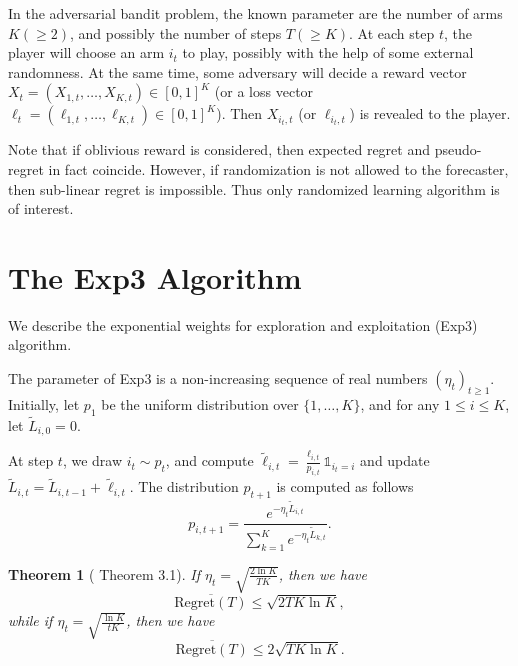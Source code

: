 \documentclass[openany]{book}
\newtheorem{theorem}{Theorem}[chapter]
\theoremstyle{definition}
\theoremstyle{remark}
\begin{document}
In the adversarial bandit problem, the known parameter are the number of arms $K(\ge2)$, and possibly the number of steps $T(\ge K)$. At each step $t$, the player will choose an arm $i_t$ to play, possibly with the help of some external randomness. At the same time, some adversary will decide a reward vector $X_t=(X_{1,t},\ldots,X_{K,t})\in[0,1]^K$ (or a loss vector $\ell_t=(\ell_{1,t},\ldots,\ell_{K,t})\in[0,1]^K$). Then $X_{i_t,t}$ (or $\ell_{i_t,t}$) is revealed to the player.

Note that if oblivious reward is considered, then expected regret and pseudo-regret in fact coincide. However, if randomization is not allowed to the forecaster, then sub-linear regret is impossible. Thus only randomized learning algorithm is of interest.

\section{The Exp3 Algorithm}
We describe the exponential weights for exploration and exploitation (Exp3) algorithm.

The parameter of Exp3 is a non-increasing sequence of real numbers $(\eta_t)_{t\ge1}$. Initially, let $p_1$ be the uniform distribution over $\{1,\ldots,K\}$, and for any $1\le i\le K$, let $\widetilde{L}_{i,0}=0$.

At step $t$, we draw $i_t\sim p_t$, and compute $\widetilde{\ell}_{i,t}=\frac{\ell_{i,t}}{p_{i,t}}\mathds{1}_{i_t=i}$ and update $\widetilde{L}_{i,t}=\widetilde{L}_{i,t-1}+\widetilde{\ell}_{i,t}$. The distribution $p_{t+1}$ is computed as follows
\begin{equation}
    p_{i,t+1}=\frac{e^{-\eta_t\widetilde{L}_{i,t}}}{\sum_{k=1}^{K}e^{-\eta_t\widetilde{L}_{k,t}}}.
\end{equation}

\begin{theorem}[\cite{BC12} Theorem 3.1]
    If $\eta_t=\sqrt{\frac{2\ln K}{TK}}$, then we have
    \begin{equation}
        \overline{\mathrm{Regret}(T)}\le\sqrt{2TK\ln K},
    \end{equation}
    while if $\eta_t=\sqrt{\frac{\ln K}{tK}}$, then we have
    \begin{equation}
        \overline{\mathrm{Regret}(T)}\le2\sqrt{TK\ln K}.
    \end{equation}
\end{theorem}



\end{document}
